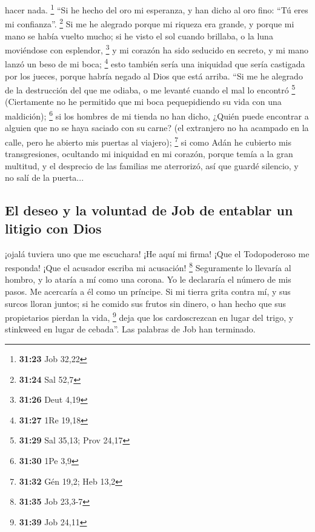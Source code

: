 \begin{paracol}{2}
hacer nada. \footnote{\textbf{31:23} Job 32,22}  ``Si he
hecho del oro mi esperanza, y han dicho al oro fino: ``Tú eres mi
confianza''. \footnote{\textbf{31:24} Sal 52,7}  Si me he
alegrado porque mi riqueza era grande, y porque mi mano se había vuelto
mucho;  si he visto el sol cuando brillaba, o la luna
moviéndose con esplendor, \footnote{\textbf{31:26} Deut 4,19}
 y mi corazón ha sido seducido en secreto, y mi mano
lanzó un beso de mi boca; \footnote{\textbf{31:27} 1Re 19,18}
 esto también sería una iniquidad que sería castigada por
los jueces, porque habría negado al Dios que está arriba.
 ``Si me he alegrado de la destrucción del que me odiaba,
o me levanté cuando el mal lo encontró \footnote{\textbf{31:29} Sal
  35,13; Prov 24,17}  (Ciertamente no he permitido que mi
boca pequepidiendo su vida con una maldición); \footnote{\textbf{31:30}
  1Pe 3,9}  si los hombres de mi tienda no han dicho,
¿Quién puede encontrar a alguien que no se haya saciado con su carne?
 (el extranjero no ha acampado en la calle, pero he
abierto mis puertas al viajero); \footnote{\textbf{31:32} Gén 19,2; Heb
  13,2}  si como Adán he cubierto mis transgresiones,
ocultando mi iniquidad en mi corazón,  porque temía a la
gran multitud, y el desprecio de las familias me aterrorizó, así que
guardé silencio, y no salí de la puerta...

\hypertarget{el-deseo-y-la-voluntad-de-job-de-entablar-un-litigio-con-dios}{%
\subsection{El deseo y la voluntad de Job de entablar un litigio con
Dios}\label{el-deseo-y-la-voluntad-de-job-de-entablar-un-litigio-con-dios}}

 ¡ojalá tuviera uno que me escuchara! ¡He aquí mi firma!
¡Que el Todopoderoso me responda! ¡Que el acusador escriba mi acusación!
\footnote{\textbf{31:35} Job 23,3-7}  Seguramente lo
llevaría al hombro, y lo ataría a mí como una corona.  Yo
le declararía el número de mis pasos. Me acercaría a él como un
príncipe.  Si mi tierra grita contra mí, y sus surcos
lloran juntos;  si he comido sus frutos sin dinero, o han
hecho que sus propietarios pierdan la vida, \footnote{\textbf{31:39} Job
  24,11}  deja que los cardoscrezcan en lugar del trigo,
y stinkweed en lugar de cebada''. Las palabras de Job han terminado.


\end{paracol}
